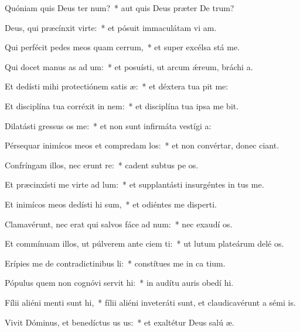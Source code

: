 \item Quóniam quis Deus ter num?~* aut quis Deus præter De trum?
\item Deus, qui præcínxit  virte:~* et pósuit immaculátam vi am.
\item Qui perfécit pedes meos quam cerrum,~* et super excélsa stá me.
\item Qui docet manus as ad um:~* et posuísti, ut arcum ǽreum, bráchi a.
\item Et dedísti mihi protectiónem satis æ:~* et déxtera tua pit me:
\item Et disciplína tua corréxit  in nem:~* et disciplína tua ipsa me bit.
\item Dilatásti gressus os  me:~* et non sunt infirmáta vestígi a:
\item Pérsequar inimícos meos et compredam los:~* et non convértar, donec ciant.
\item Confríngam illos, nec erunt re:~* cadent subtus pe os.
\item Et præcinxísti me virte ad lum:~* et supplantásti insurgéntes in  tus me.
\item Et inimícos meos dedísti hi sum,~* et odiéntes me disperti.
\item Clamavérunt, nec erat qui salvos fáce ad num:~* nec exaudí os.
\item Et commínuam illos, ut púlverem ante ciem ti:~* ut lutum plateárum delé os.
\item Erípies me de contradictinibus li:~* constítues me in ca tium.
\item Pópulus quem non cognóvi servit hi:~* in audítu auris obedí hi.
\item Fílii aliéni menti sunt hi,~* fílii aliéni inveteráti sunt, et claudicavérunt a sémi is.
\item Vivit Dóminus, et benedíctus us us:~* et exaltétur Deus salú æ.
